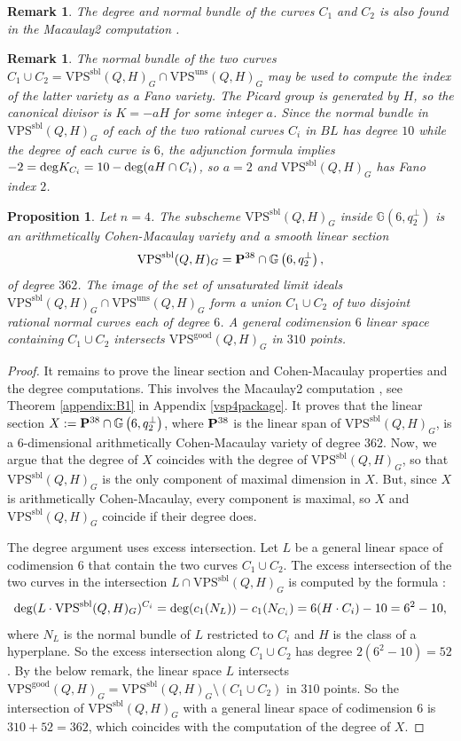 \documentclass{amsart}
\newcommand{\PP}{{\bf P}}
\def\Gr #1#2{{\mathbb G}\left(#1,#2\right)} %
\newcommand{\VPSsbl}{{\mathrm{VPS}}^{\mathrm{sbl}}(Q, H)}
\newcommand{\VPSuns}{{\mathrm{VPS}}^{\mathrm{uns}}(Q, H)}
\newcommand{\VPSgood}{{\mathrm{VPS}}^{\mathrm{good}}(Q, H)}
\newtheorem{proposition}[lemma]{\bf Proposition}
\newtheorem{remark}[lemma]{\bf Remark}
\begin{document}
\begin{remark}\label{degreecomp} {\rm The degree and normal bundle of the curves $C_1$ and $C_2$ is also found in the Macaulay2 computation \cite{Mac2S}.
}
\end{remark}
\begin{remark}\label{index2} {\rm The normal bundle of the two curves $C_1\cup C_2=\VPSsbl_G\cap \VPSuns_G$ may be used to compute the index of the latter variety as a Fano variety. The Picard group is generated by $H$, so the canonical divisor is  $K=-aH$ for some integer $a$.   Since the normal bundle  in $\VPSsbl_G$ of each of the two rational curves $C_i$ in $BL$ has degree $10$ while the degree of
each curve is $6$, the adjunction formula implies $-2={\rm deg}K_{C_i}= 10-{\rm deg}(aH\cap C_i)$, so $a=2$ and $\VPSsbl_G$ has Fano index $2$.}

\end{remark}
\begin{proposition}\label{ref:linearSection:prop} Let $n=4$. The subscheme
    $\VPSsbl_G$ inside $\Gr{6}{q^{\perp}_2}$ is an arithmetically Cohen-Macaulay variety and a smooth linear section
$$\VPSsbl_G=\PP^{38}\cap \Gr{6}{q^{\perp}_2},$$
of degree $362$.
The image of the set of unsaturated limit ideals $\VPSsbl_G\cap \VPSuns_G$ form a union $C_1\cup C_2$ of two disjoint rational normal curves each of degree $6$.
A general codimension $6$ linear space containing $C_1\cup C_2$ intersects $\VPSgood_G$ in $310$ points.
\end{proposition}
\begin{proof}
It remains to prove the linear section and Cohen-Macaulay properties and the degree computations.  This involves the Macaulay2 computation \cite{Mac2S}, see Theorem \ref{appendix:B1} in Appendix \ref{vsp4package}. 
It proves that the linear section $X:=\PP^{38}\cap \Gr{6}{q^{\perp}_2}$, where $\PP^{38}$ is the linear span of $\VPSsbl_G$, is a $6$-dimensional arithmetically Cohen-Macaulay variety of degree $362$.
Now, we argue that the degree of $X$ coincides with the degree of $\VPSsbl_G$, so that $\VPSsbl_G$ is the only component of maximal dimension in $X$.  But, since $X$ is arithmetically Cohen-Macaulay, every component is maximal, so $X$ and $\VPSsbl_G$ coincide if their degree does. 


The degree argument uses excess intersection.  Let $L$ be a general linear space of codimension $6$ that contain the two curves $C_1\cup C_2$.  The excess intersection of the two curves in the intersection $L\cap \VPSsbl_G$ is computed by
the formula \cite[Prop 9.1.1.(2)]{Fulton}:
$${\rm deg}(L\cdot \VPSsbl_G)^{C_i}={\rm deg}(c_1(N_L))-c_1(N_{C_i})=6(H\cdot C_i)-10=6^2-10,$$
where $N_L$ is the normal bundle of $L$ restricted to $C_i$ and $H$ is the class of a hyperplane.
So the excess intersection along $C_1\cup C_2$ has degree $2(6^2-10)=52$. 
By the below remark, the linear space $L$ intersects $\VPSgood_G=\VPSsbl_G\setminus (C_1\cup C_2)$ in $310$ points. So the intersection of  $\VPSsbl_G$ with a general linear space of codimension $6$ is $310+52=362$, which coincides with the computation of the degree of $X$.
\end{proof}
\end{document}
